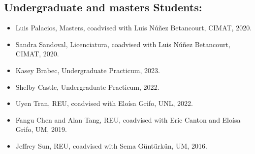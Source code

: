 \documentclass[11pt]{amsart}
\begin{document}
\subsection*{Undergraduate and masters Students:}
\begin{itemize}[leftmargin=9mm]
	\item Luis Palacios, Masters, coadvised with Luis N\'u\~nez Betancourt, CIMAT, 2020.
	\item Sandra Sandoval, Licenciatura, coadvised with Luis N\'u\~nez Betancourt, CIMAT, 2020.	
	\item Kasey Brabec, Undergraduate Practicum, 2023.
	\item Shelby Castle, Undergraduate Practicum, 2022.

	\item Uyen Tran, REU, coadvised with Elo\'isa Grifo, UNL, 2022.
	\item Fangu Chen and Alan Tang, REU, coadvised with Eric Canton and Elo\'isa Grifo, UM, 2019.
	\item Jeffrey Sun, REU, coadvised with Sema G\"unt\"urk\"un, UM, 2016.
\end{itemize}
\end{document}
